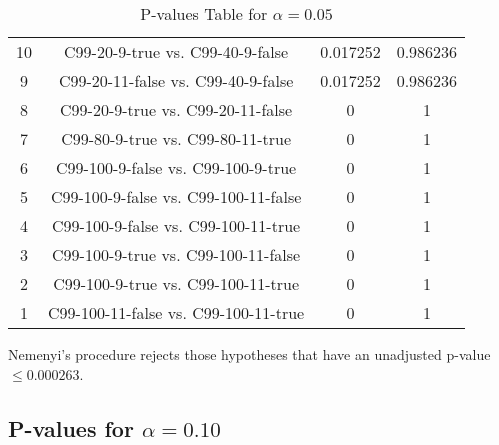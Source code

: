 \documentclass[a4paper,10pt]{article}
\begin{document}
\begin{landscape}
\begin{table}[!htp]
\begin{tabular}{cccc}
10&C99-20-9-true vs. C99-40-9-false&0.017252&0.986236\\
9&C99-20-11-false vs. C99-40-9-false&0.017252&0.986236\\
8&C99-20-9-true vs. C99-20-11-false&0&1\\
7&C99-80-9-true vs. C99-80-11-true&0&1\\
6&C99-100-9-false vs. C99-100-9-true&0&1\\
5&C99-100-9-false vs. C99-100-11-false&0&1\\
4&C99-100-9-false vs. C99-100-11-true&0&1\\
3&C99-100-9-true vs. C99-100-11-false&0&1\\
2&C99-100-9-true vs. C99-100-11-true&0&1\\
1&C99-100-11-false vs. C99-100-11-true&0&1\\
\hline
\end{tabular}
\caption{P-values Table for $\alpha=0.05$}
\end{table}Nemenyi's procedure rejects those hypotheses that have an unadjusted p-value $\le0.000263$.

\pagebreak

\subsection{P-values for $\alpha=0.10$}


\end{landscape}
\end{document}
